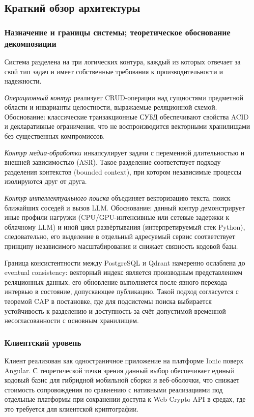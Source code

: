 \documentclass{article}
\begin{document}
\subsection{Краткий обзор архитектуры}

\subsubsection{Назначение и границы системы; теоретическое обоснование декомпозиции}

Система разделена на три логических контура, каждый из которых отвечает за свой тип задач и имеет собственные требования к производительности и надежности.

\textit{Операционный контур} реализует CRUD-операции над сущностями предметной области и инварианты целостности, выражаемые реляционной схемой. Обоснование: классические транзакционные СУБД обеспечивают свойства ACID и декларативные ограничения, что не воспроизводится векторными хранилищами без существенных компромиссов.

\textit{Контур медиа-обработки} инкапсулирует задачи с переменной длительностью и внешней зависимостью (ASR). Такое разделение соответствует подходу разделения контекстов (bounded context), 
при котором независимые процессы изолируются друг от друга.

\textit{Контур интеллектуального поиска} объединяет векторизацию текста, поиск ближайших соседей и вызов LLM. Обоснование: данный контур демонстрирует иные профили нагрузки (CPU/GPU-интенсивные или сетевые задержки к облачному LLM) и иной цикл развёртывания (интерпретируемый стек Python), следовательно, его выделение в отдельный адресуемый сервис соответствует принципу независимого масштабирования и снижает связность кодовой базы.

Граница консистентности между PostgreSQL и Qdrant намеренно ослаблена до eventual consistency: векторный индекс является производным представлением реляционных данных; его обновление выполняется после явного перехода интервью в состояние, допускающее публикацию. Такой подход согласуется с теоремой CAP в постановке, где для подсистемы поиска выбирается устойчивость к разделению и доступность за счёт допустимой временной несогласованности с основным хранилищем.

\subsubsection{Клиентский уровень}

Клиент реализован как одностраничное приложение на платформе Ionic поверх Angular. С теоретической точки зрения данный выбор обеспечивает единый кодовый базис для гибридной мобильной сборки и веб-оболочки, что снижает стоимость сопровождения по сравнению с нативными реализациями под отдельные платформы при сохранении доступа к Web Crypto API в средах, где это требуется для клиентской криптографии.
\end{document}
